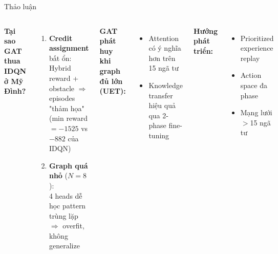 \documentclass[aspectratio=169]{beamer}
\begin{document}
\begin{frame}{Thảo luận}
  \begin{columns}
      \textbf{Tại sao GAT thua IDQN ở Mỹ Đình?}
      \begin{enumerate}
        \item \textbf{Credit assignment} bất ổn:\\
              Hybrid reward + obstacle $\Rightarrow$ episodes "thảm họa"\\
              (min reward $= -1525$ vs $-882$ của IDQN)
        \item \textbf{Graph quá nhỏ} ($N=8$):\\
              4 heads dễ học pattern trùng lặp\\
              $\Rightarrow$ overfit, không generalize
      \end{enumerate}

      \textbf{GAT phát huy khi graph đủ lớn (UET):}
      \begin{itemize}
        \item Attention có ý nghĩa hơn trên 15 ngã tư
        \item Knowledge transfer hiệu quả qua 2-phase fine-tuning
      \end{itemize}
      \vspace{0.5em}
      \textbf{Hướng phát triển:}
      \begin{itemize}
        \item Prioritized experience replay
        \item Action space đa phase
        \item Mạng lưới $>$15 ngã tư
      \end{itemize}
  \end{columns}
\end{frame}
\end{document}
